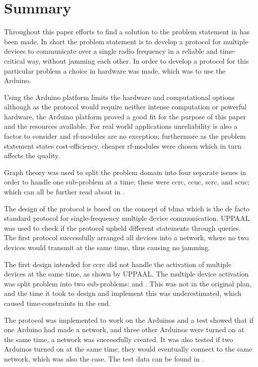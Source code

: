 \section{Summary}\label{cha:conclusion}
Throughout this paper efforts to find a solution to the problem statement in  has been made.
In short the problem statement is to develop a protocol for multiple devices to communicate over a single radio frequency in a reliable and time-critical way, without jamming each other.
In order to develop a protocol for this particular problem a choice in hardware was made, which was to use the Arduino.

Using the Arduino platform limits the hardware and computational options although as the protocol would require neither intense computation or powerful hardware, the Arduino platform proved a good fit for the purpose of this paper and the resources available.
For real world applications unreliability is also a factor to consider and \gls{rf}-modules are no exception; furthermore as the problem statement states cost-efficiency, cheaper \gls{rf}-modules were chosen which in turn affects the quality.

\bigskip \noindent
Graph theory was used to split the problem domain into four separate issues in order to handle one sub-problem at a time; these were \acrfull{ccrc}, \acrfull{ccuc}, \acrfull{scrc}, and \acrfull{scuc}; which can all be further read about in .

The design of the protocol is based on the concept of \acrfull{tdma} which is the de facto standard protocol for single-frequency multiple device communication.
UPPAAL was used to check if the protocol upheld different statements through queries.
The first protocol successfully arranged all devices into a network, where no two devices would transmit at the same time, thus causing no jamming.

The first design intended for \acrshort{ccrc} did not handle the activation of multiple devices at the same time, as shown by UPPAAL.
The multiple device activation was split problem into two sub-problems:  and .
This was not in the original plan, and the time it took to design and implement this was underestimated, which caused time-constraints in the end.

The protocol was implemented to work on the Arduinos and a test showed that if one Arduino had made a network, and three other Arduinos were turned on at the same time, a network was successfully created.
It was also tested if two Arduinos turned on at the same time, they would eventually connect to the same network, which was also the case.
The test data can be found in .

